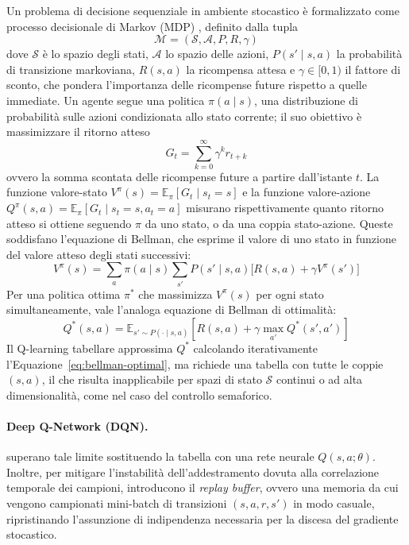 Un problema di decisione sequenziale in ambiente stocastico è formalizzato 
come processo decisionale di Markov (MDP) \citep{suttonbarto2018}, definito dalla tupla
\[\mathcal{M} = (\mathcal{S}, \mathcal{A}, P, R, \gamma)\] dove $\mathcal{S}$ è
lo spazio degli stati, $\mathcal{A}$ lo spazio delle azioni, $P(s' \mid s,a)$
la probabilità di transizione markoviana,
$R(s,a)$ la ricompensa attesa e $\gamma \in [0,1)$ il fattore di sconto, che
pondera l'importanza delle ricompense future rispetto a quelle immediate. 
Un agente segue una politica
$\pi(a \mid s)$, una distribuzione di probabilità sulle azioni condizionata
allo stato corrente; il suo obiettivo è massimizzare il ritorno atteso
\[G_t = \sum_{k=0}^{\infty} \gamma^k r_{t+k}\] ovvero la somma scontata delle
ricompense future a partire dall'istante $t$. La funzione valore-stato
$V^\pi(s) = \mathbb{E}_\pi[G_t \mid s_t = s]$ e la funzione valore-azione
$Q^\pi(s,a) = \mathbb{E}_\pi[G_t \mid s_t=s, a_t=a]$ misurano rispettivamente
quanto ritorno atteso si ottiene seguendo $\pi$ da uno stato, o da una
coppia stato-azione. Queste soddisfano l'equazione di Bellman, che esprime il
valore di uno stato in funzione del valore atteso degli stati successivi:
\begin{equation}
  V^\pi(s) = \sum_a \pi(a\mid s) \sum_{s'} P(s'\mid s,a) \big[R(s,a) + \gamma V^\pi(s')\big]
\end{equation}
Per una politica ottima $\pi^*$ che massimizza $V^\pi(s)$ per ogni
stato simultaneamente, vale l'analoga equazione di Bellman di ottimalità:
\begin{equation}
  Q^*(s,a) = \mathbb{E}_{s' \sim P(\cdot \mid s,a)}\left[
    R(s,a) + \gamma \max_{a'} Q^*(s', a')
  \right]
  \label{eq:bellman-optimal}
\end{equation}
Il Q-learning tabellare approssima $Q^*$ calcolando iterativamente 
l'Equazione~\ref{eq:bellman-optimal}, ma richiede una tabella con tutte le coppie 
$(s,a)$, il che risulta inapplicabile per spazi di stato $\mathcal{S}$ 
continui o ad alta dimensionalità, come nel caso del controllo semaforico.

\paragraph{Deep Q-Network (DQN).} \citet{mnih2015dqn} superano tale limite sostituendo la tabella con
una rete neurale $Q(s,a;\theta)$. Inoltre, per mitigare l'instabilità dell'addestramento dovuta alla correlazione temporale 
dei campioni, introducono il \emph{replay buffer}, ovvero una memoria da cui vengono campionati mini-batch 
di transizioni $(s,a,r,s')$ in modo casuale, ripristinando l'assunzione di indipendenza 
necessaria per la discesa del gradiente stocastico.

